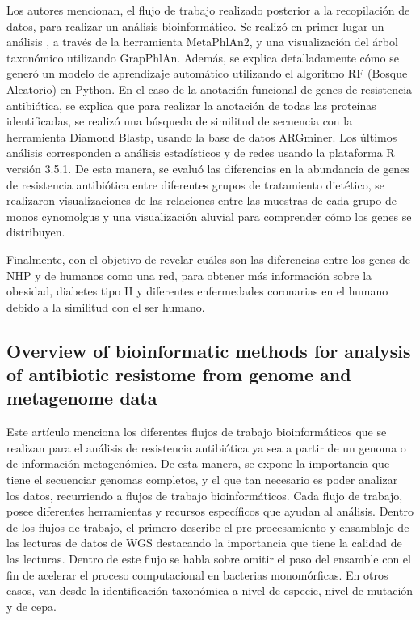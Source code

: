 \documentclass[12pt]{article}
\begin{document}
Los autores mencionan, el flujo de trabajo realizado posterior a la recopilación de datos, para realizar un análisis bioinformático. Se realizó en primer lugar un análisis , a través de la herramienta MetaPhlAn2, y una visualización del árbol taxonómico utilizando GrapPhlAn. Además, se explica detalladamente cómo se generó un modelo de aprendizaje automático utilizando el algoritmo RF (Bosque Aleatorio) en Python.  En el caso de la anotación funcional de genes de resistencia antibiótica, se explica que para realizar la anotación de todas las proteínas identificadas, se realizó una búsqueda de similitud de secuencia con la herramienta Diamond Blastp, usando la base de datos ARGminer. Los últimos análisis corresponden a análisis estadísticos y de redes usando la plataforma R versión 3.5.1. De esta manera, se evaluó las diferencias en la abundancia de genes de resistencia antibiótica entre diferentes grupos de tratamiento dietético, se realizaron visualizaciones de las relaciones entre las muestras de cada grupo de monos cynomolgus y una visualización aluvial para comprender cómo los genes se distribuyen.

Finalmente, con el objetivo de revelar cuáles son las diferencias entre los genes de NHP y de humanos como una red, para obtener más información sobre la obesidad, diabetes tipo II y diferentes enfermedades coronarias en el humano debido a la similitud con el ser humano.



\subsection*{Overview of bioinformatic methods for analysis of antibiotic resistome from genome and metagenome data}
Este artículo menciona los diferentes flujos de trabajo bioinformáticos que se realizan para el análisis de resistencia antibiótica ya sea a partir de un genoma o de información metagenómica.  De esta manera, se expone la importancia que tiene el secuenciar genomas completos, y el que tan necesario es poder analizar los datos, recurriendo a flujos de trabajo bioinformáticos. Cada flujo de trabajo, posee diferentes herramientas y recursos específicos que ayudan al análisis. Dentro de los flujos de trabajo, el primero describe el pre procesamiento y ensamblaje de las lecturas de datos de WGS destacando la importancia que tiene la calidad de las lecturas. Dentro de este flujo se habla sobre omitir el paso del ensamble con el fin de acelerar el proceso computacional en bacterias monomórficas. En otros casos, van desde la identificación taxonómica a nivel de especie, nivel de mutación y de cepa.
\end{document}

